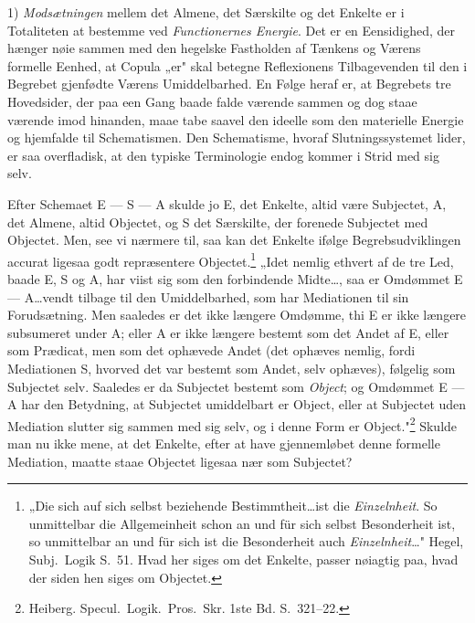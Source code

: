 \documentclass[12pt]{book}
\newcommand{\opage}[1]{\marginnote{\footnotesize\textit{[#1]}}}
\begin{document}
1) \emph{Modsætningen} mellem det Almene, det Særskilte og det Enkelte er i Totaliteten at bestemme
ved \emph{Functionernes Energie}. Det er en Eensidighed, der hænger nøie sammen med den hegelske
Fastholden af Tænkens og Værens formelle Eenhed, at Copula „er" skal betegne Reflexionens
Tilbagevenden til den i Begrebet gjenfødte Værens Umiddelbarhed. En Følge heraf er, at Begrebets tre
Hovedsider, der paa een Gang baade falde værende sammen og dog staae værende imod hinanden, maae tabe
saavel den ideelle som den materielle Energie og hjemfalde til Schematismen. Den Schematisme, hvoraf
Slutningssystemet lider, er saa overfladisk, at den typiske Terminologie endog kommer i Strid med sig
selv.

Efter Schemaet E — S — A skulde jo E, det Enkelte, altid være Subjectet, A, det Almene, altid
Objectet, og S det Særskilte, der forenede Subjectet med Objectet. Men, see vi nærmere til, saa kan
det Enkelte ifølge Begrebsudviklingen accurat ligesaa godt repræsentere Objectet.\footnote{„Die sich
auf sich selbst beziehende Bestimmtheit\ldots ist die \emph{Einzelnheit}. So unmittelbar die
Allgemeinheit schon an und für sich selbst Besonderheit ist, so unmittelbar an und für sich ist die
Besonderheit auch \emph{Einzelnheit}\ldots" Hegel, Subj.\ Logik S.~51. Hvad her siges om det Enkelte,
passer nøiagtig paa, hvad der siden hen siges om Objectet.} „Idet nemlig
\opage{431} ethvert af de tre Led, baade E, S og A, har viist sig som den forbindende Midte\ldots, saa er
Omdømmet E — A\ldots vendt tilbage til den Umiddelbarhed, som har Mediationen til sin Forudsætning.
Men saaledes er det ikke længere Omdømme, thi E er ikke længere subsumeret under A; eller A er ikke
længere bestemt som det Andet af E, eller som Prædicat, men som det ophævede Andet (det ophæves
nemlig, fordi Mediationen S, hvorved det var bestemt som Andet, selv ophæves), følgelig som Subjectet
selv. Saaledes er da Subjectet bestemt som \emph{Object}; og Omdømmet E — A har den Betydning, at
Subjectet umiddelbart er Object, eller at Subjectet uden Mediation slutter sig sammen med sig selv, og
i denne Form er Object."\footnote{Heiberg. Specul.\ Logik.\ Pros.\ Skr. 1ste Bd. S.~321--22.} Skulde
man nu ikke mene, at det Enkelte, efter at have gjennemløbet denne formelle Mediation, maatte staae
Objectet ligesaa nær som Subjectet?
\end{document}
